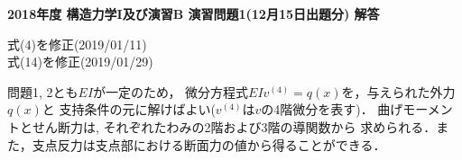 \documentclass[10pt,a4j]{jarticle}
\newlength{\minitwocolumn}
\begin{document}
\newcommand{\fat}[1]{\mbox{\boldmath $#1$}}
\newcommand{\D}{\partial}
\newcommand{\w}{\omega}
\newcommand{\ga}{\alpha}
\newcommand{\gb}{\beta}
\newcommand{\gx}{\xi}
\newcommand{\gz}{\zeta}
\newcommand{\vhat}[1]{\hat{\fat{#1}}}
\newcommand{\spc}{\vspace{0.7\baselineskip}}
\newcommand{\halfspc}{\vspace{0.3\baselineskip}}

\pagestyle{empty}
\newcommand{\twofig}[2]
 {
   \begin{figure}[h]
     \begin{minipage}[t]{\minitwocolumn}
         \begin{center}   #1
         \end{center}
     \end{minipage}
         \hspace{\columnsep}
     \begin{minipage}[t]{\minitwocolumn}
         \begin{center} #2
         \end{center}
     \end{minipage}
   \end{figure}
 }
\begin{center}
{\Large \bf 2018年度 構造力学I及び演習B 演習問題1(12月15日出題分) 解答} \\
\end{center}
\begin{flushright}
	式(4)を修正(2019/01/11)\\
	式(14)を修正(2019/01/29)\\
\end{flushright}
問題1, 2とも$EI$が一定のため，
微分方程式$EIv^{(4)}=q(x)$を，与えられた外力$q(x)$と
支持条件の元に解けばよい($v^{(4)}$は$v$の4階微分を表す)．
曲げモーメントとせん断力は, それぞれたわみの2階および3階の導関数から
求められる．また，支点反力は支点部における断面力の値から得ることができる．
\end{document}
